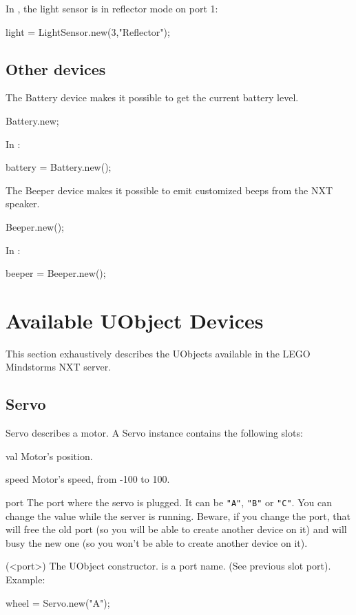 In , the light sensor is in reflector mode on port 1:
\begin{urbiunchecked}
light = LightSensor.new(3,"Reflector");
\end{urbiunchecked}


\subsection{Other devices}
The Battery device makes it possible to get the current battery level.
\begin{urbiunchecked}
Battery.new;
\end{urbiunchecked}

In :
\begin{urbiunchecked}
battery = Battery.new();
\end{urbiunchecked}

The Beeper device makes it possible to emit customized beeps from the NXT
speaker.
\begin{urbiunchecked}
Beeper.new();
\end{urbiunchecked}

In :
\begin{urbiunchecked}
beeper = Beeper.new();
\end{urbiunchecked}


\section{Available UObject Devices}
\label{sec:nxt:specs}
This section exhaustively describes the UObjects available in the LEGO
Mindstorms NXT \urbi server.

\subsection{Servo}
Servo describes a motor. A Servo instance contains the following slots:

\begin{urbiscriptapi}
\item[val] Motor's position.

\item[speed] Motor's speed, from -100 to 100.

\item[port] The port where the servo is plugged. It can be \lstinline{"A"},
  \lstinline{"B"} or \lstinline{"C"}. You can change the value while the
  server is running. Beware, if you change the port, that will free the old
  port (so you will be able to create another device on it) and will busy
  the new one (so you won't be able to create another device on it).

\item[init](<port>) The UObject constructor.  is a port name. (See
  previous slot port). Example:
\begin{urbiunchecked}
wheel = Servo.new("A");
\end{urbiunchecked}
\end{urbiscriptapi}


